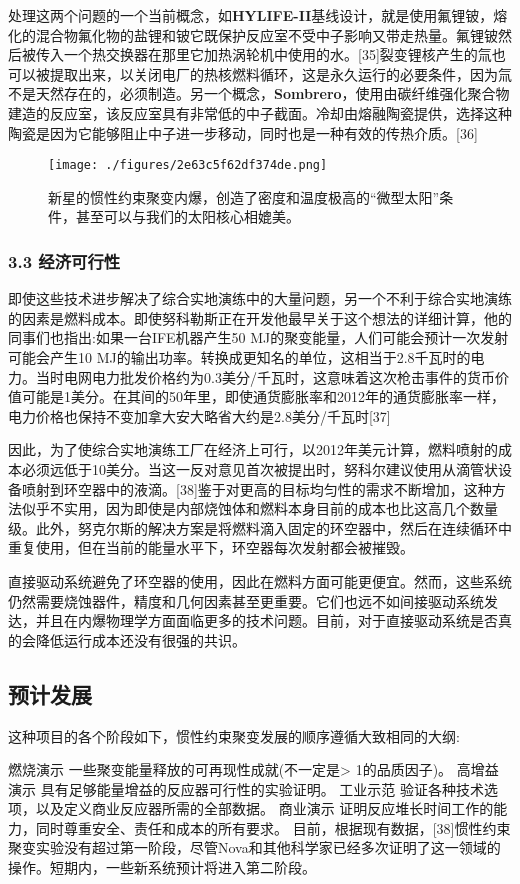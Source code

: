 处理这两个问题的一个当前概念，如\textbf{HYLIFE-II}基线设计，就是使用氟锂铍，熔化的混合物氟化物的盐锂和铍它既保护反应室不受中子影响又带走热量。氟锂铍然后被传入一个热交换器在那里它加热涡轮机中使用的水。[35]裂变锂核产生的氚也可以被提取出来，以关闭电厂的热核燃料循环，这是永久运行的必要条件，因为氚不是天然存在的，必须制造。另一个概念，\textbf{Sombrero}，使用由碳纤维强化聚合物建造的反应室，该反应室具有非常低的中子截面。冷却由熔融陶瓷提供，选择这种陶瓷是因为它能够阻止中子进一步移动，同时也是一种有效的传热介质。[36]
\begin{figure}[ht]
\centering
\texttt{[image: ./figures/2e63c5f62df374de.png]}
\caption{新星的惯性约束聚变内爆，创造了密度和温度极高的“微型太阳”条件，甚至可以与我们的太阳核心相媲美。} \label{fig_GXYS_6}
\end{figure}
\subsubsection{3.3 经济可行性}
即使这些技术进步解决了综合实地演练中的大量问题，另一个不利于综合实地演练的因素是燃料成本。即使努科勒斯正在开发他最早关于这个想法的详细计算，他的同事们也指出:如果一台IFE机器产生50 MJ的聚变能量，人们可能会预计一次发射可能会产生10 MJ的输出功率。转换成更知名的单位，这相当于2.8千瓦时的电力。当时电网电力批发价格约为0.3美分/千瓦时，这意味着这次枪击事件的货币价值可能是1美分。在其间的50年里，即使通货膨胀率和2012年的通货膨胀率一样，电力价格也保持不变加拿大安大略省大约是2.8美分/千瓦时[37]

因此，为了使综合实地演练工厂在经济上可行，以2012年美元计算，燃料喷射的成本必须远低于10美分。当这一反对意见首次被提出时，努科尔建议使用从滴管状设备喷射到环空器中的液滴。[38]鉴于对更高的目标均匀性的需求不断增加，这种方法似乎不实用，因为即使是内部烧蚀体和燃料本身目前的成本也比这高几个数量级。此外，努克尔斯的解决方案是将燃料滴入固定的环空器中，然后在连续循环中重复使用，但在当前的能量水平下，环空器每次发射都会被摧毁。

直接驱动系统避免了环空器的使用，因此在燃料方面可能更便宜。然而，这些系统仍然需要烧蚀器件，精度和几何因素甚至更重要。它们也远不如间接驱动系统发达，并且在内爆物理学方面面临更多的技术问题。目前，对于直接驱动系统是否真的会降低运行成本还没有很强的共识。

\subsection{预计发展}
这种项目的各个阶段如下，惯性约束聚变发展的顺序遵循大致相同的大纲:

燃烧演示
一些聚变能量释放的可再现性成就(不一定是> 1的品质因子)。
高增益演示
具有足够能量增益的反应器可行性的实验证明。
工业示范
验证各种技术选项，以及定义商业反应器所需的全部数据。
商业演示
证明反应堆长时间工作的能力，同时尊重安全、责任和成本的所有要求。
目前，根据现有数据，[38]惯性约束聚变实验没有超过第一阶段，尽管Nova和其他科学家已经多次证明了这一领域的操作。短期内，一些新系统预计将进入第二阶段。

